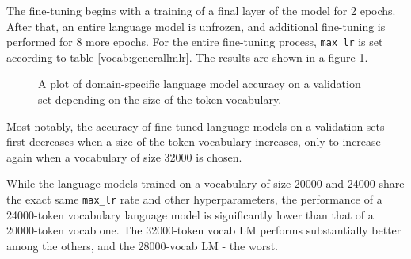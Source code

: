 The fine-tuning begins with a training of a final layer of the model for 2 epochs. After that, an entire language model is unfrozen, and additional fine-tuning is performed for 8 more epochs. For the entire fine-tuning process, \lstinline{max_lr} is set according to table \ref{vocab:generallmlr}. The results are shown in a figure \ref{vocab:lmlrplot}.

\begin{figure}
\centering
{}
\caption{A plot of domain-specific language model accuracy on a validation set depending on the size of the token vocabulary.}
\label{vocab:lmlrplot}
\end{figure}

Most notably, the accuracy of fine-tuned language models on a validation sets first decreases when a size of the token vocabulary increases, only to increase again when a vocabulary of size 32000 is chosen. 

While the language models trained on a vocabulary of size 20000 and 24000 share the exact same \lstinline{max_lr} rate and other hyperparameters, the performance of a 24000-token vocabulary language model is significantly lower than that of a 20000-token vocab one. The 32000-token vocab LM performs substantially better among the others, and the 28000-vocab LM - the worst.

